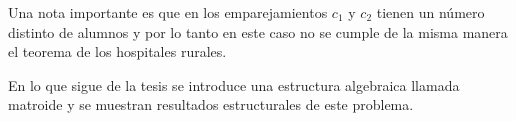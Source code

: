 Una nota importante es que en los emparejamientos $c_1$ y $c_2$ tienen un número distinto de alumnos y por lo tanto en este caso no se cumple de la misma manera el teorema de los hospitales rurales. 

En lo que sigue de la tesis se introduce una estructura algebraica llamada matroide y se muestran resultados estructurales de este problema.


